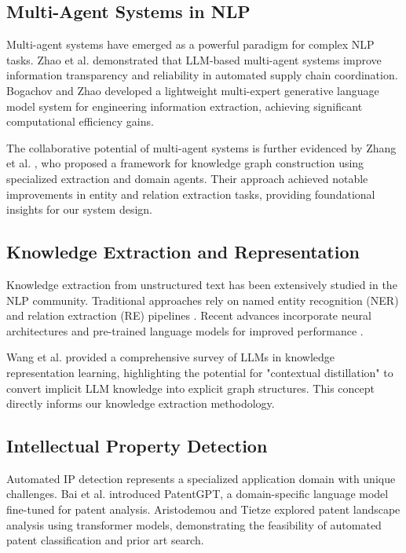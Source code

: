 \documentclass[11pt,a4paper]{article}
\begin{document}
\subsection{Multi-Agent Systems in NLP}

Multi-agent systems have emerged as a powerful paradigm for complex NLP tasks. Zhao et al. \citep{zhao2025multia} demonstrated that LLM-based multi-agent systems improve information transparency and reliability in automated supply chain coordination. Bogachov and Zhao \citep{bogachov2025lightweight} developed a lightweight multi-expert generative language model system for engineering information extraction, achieving significant computational efficiency gains.

The collaborative potential of multi-agent systems is further evidenced by Zhang et al. \citep{zhang2024multiagent}, who proposed a framework for knowledge graph construction using specialized extraction and domain agents. Their approach achieved notable improvements in entity and relation extraction tasks, providing foundational insights for our system design.

\subsection{Knowledge Extraction and Representation}

Knowledge extraction from unstructured text has been extensively studied in the NLP community. Traditional approaches rely on named entity recognition (NER) and relation extraction (RE) pipelines \citep{li2022survey}. Recent advances incorporate neural architectures and pre-trained language models for improved performance \citep{wang2024large}.

Wang et al. \citep{wang2024survey} provided a comprehensive survey of LLMs in knowledge representation learning, highlighting the potential for "contextual distillation" to convert implicit LLM knowledge into explicit graph structures. This concept directly informs our knowledge extraction methodology.

\subsection{Intellectual Property Detection}

Automated IP detection represents a specialized application domain with unique challenges. Bai et al. \citep{bai2024patentgpt} introduced PatentGPT, a domain-specific language model fine-tuned for patent analysis. Aristodemou and Tietze \citep{aristodemou2024patent} explored patent landscape analysis using transformer models, demonstrating the feasibility of automated patent classification and prior art search.
\end{document}
